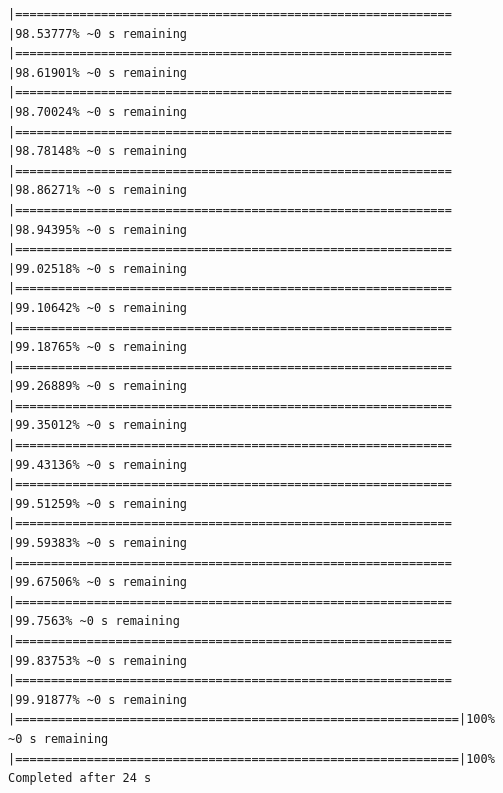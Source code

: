\documentclass{article}\usepackage[]{graphicx}\usepackage[]{xcolor}
\makeatletter
\newenvironment{kframe}{%
 \def\at@end@of@kframe{}%
 \ifinner\ifhmode%
  \def\at@end@of@kframe{\end{minipage}}%
  \begin{minipage}{\columnwidth}%
 \fi\fi%
 \def\FrameCommand##1{\hskip\@totalleftmargin \hskip-\fboxsep
 \colorbox{shadecolor}{##1}\hskip-\fboxsep
     \hskip-\linewidth \hskip-\@totalleftmargin \hskip\columnwidth}%
 \MakeFramed {\advance\hsize-\width
   \@totalleftmargin\z@ \linewidth\hsize
   \@setminipage}}%
 {\par\unskip\endMakeFramed%
 \at@end@of@kframe}
\newenvironment{knitrout}{}{} %
\makeatother
\begin{document}
\begin{knitrout}
\begin{kframe}
\begin{verbatim}
|============================================================= |98.53777% ~0 s remaining  
|============================================================= |98.61901% ~0 s remaining  
|============================================================= |98.70024% ~0 s remaining  
|============================================================= |98.78148% ~0 s remaining  
|============================================================= |98.86271% ~0 s remaining  
|============================================================= |98.94395% ~0 s remaining  
|============================================================= |99.02518% ~0 s remaining  
|============================================================= |99.10642% ~0 s remaining  
|============================================================= |99.18765% ~0 s remaining  
|============================================================= |99.26889% ~0 s remaining  
|============================================================= |99.35012% ~0 s remaining  
|============================================================= |99.43136% ~0 s remaining  
|============================================================= |99.51259% ~0 s remaining  
|============================================================= |99.59383% ~0 s remaining  
|============================================================= |99.67506% ~0 s remaining  
|============================================================= |99.7563% ~0 s remaining   
|============================================================= |99.83753% ~0 s remaining  
|============================================================= |99.91877% ~0 s remaining  
|==============================================================|100% ~0 s remaining       
|==============================================================|100%                      Completed after 24 s
\end{verbatim}


{\ttfamily\noindent\itshape\color{messagecolor}{\#\# Starting to add information to samples}}

{\ttfamily\noindent\itshape\color{messagecolor}{\#\# \ => Add clinical information to samples}}

{\ttfamily\noindent\itshape\color{messagecolor}{\#\# \ => Adding TCGA molecular information from marker papers}}

{\ttfamily\noindent\itshape\color{messagecolor}{\#\# \ => Information will have prefix 'paper\_'}}

{\ttfamily\noindent\itshape\color{messagecolor}{\#\# brca subtype information from:doi.org/10.1016/j.ccell.2018.03.014}}


\end{kframe}
\end{knitrout}
\end{document}
